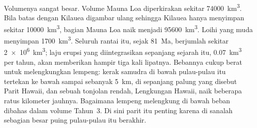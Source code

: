 Volumenya sangat besar. Volume Mauna Loa diperkirakan sekitar \qty{74000}{km^3}. Bila batas dengan Kilauea digambar ulang sehingga Kilauea hanya menyimpan sekitar
\qty{10000}{km^3}, bagian Mauna Loa naik menjadi \qty{95600}{km^3}. Loihi yang muda menyimpan
\qty{1700}{km^3}. Seluruh rantai itu, sejak \qty{81}{Ma}, berjumlah sekitar
\qty{2e6}{km^3}; laju erupsi yang diintegrasikan sepanjang sejarah itu, \qty{0.07}{km^3} per tahun, akan memberikan hampir tiga kali lipatnya. Bebannya cukup berat untuk melengkungkan
lempeng: kerak samudra di bawah pulau-pulau itu tertekan ke bawah sampai sebanyak \qty{5}{km}, di sepanjang
palung yang disebut Parit Hawaii, dan sebuah tonjolan rendah, Lengkungan Hawaii, naik beberapa ratus
kilometer jauhnya. Bagaimana lempeng melengkung di bawah beban dibahas dalam volume Tahun~3. Di sini parit itu
penting karena di sanalah sebagian besar puing pulau-pulau itu berakhir.

